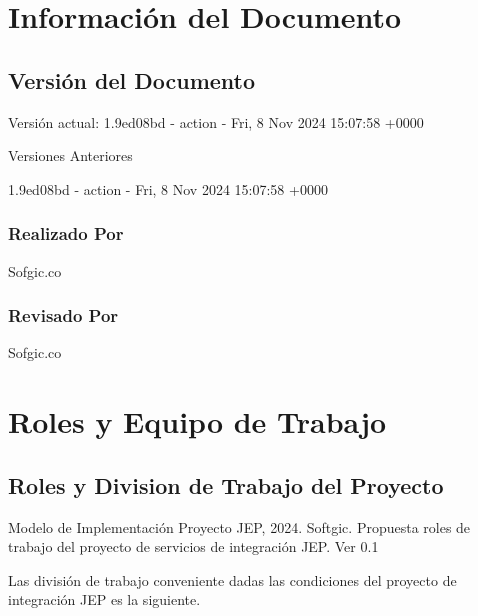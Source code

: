 \documentclass[
  paper=a4,
  ,captions=tableheading
]{scrartcl}
\renewenvironment{quote}{\begin{customblockquote}\list{}{\rightmargin=0em\leftmargin=0em}%
\item\relax\color{blockquote-text}\ignorespaces}{\unskip\unskip\endlist\end{customblockquote}}
\begin{document}
\newpage

\section{Información del
Documento}\label{sec:informaciuxf3n-del-documento}

\subsection{Versión del Documento}\label{sec:versiuxf3n-del-documento}

\begin{quote}
\end{quote}

Versión actual: 1.9ed08bd - action - Fri, 8 Nov 2024 15:07:58 +0000

Versiones Anteriores

1.9ed08bd - action - Fri, 8 Nov 2024 15:07:58 +0000

\subsubsection{Realizado Por}\label{sec:realizado-por}

Sofgic.co

\subsubsection{Revisado Por}\label{sec:revisado-por}

Sofgic.co

\newpage

\section{Roles y Equipo de Trabajo}\label{sec:roles-y-equipo-de-trabajo}

\subsection{Roles y Division de Trabajo del
Proyecto}\label{sec:roles-y-division-de-trabajo-del-proyecto}

\begin{quote}
Modelo de Implementación Proyecto JEP, 2024. Softgic. Propuesta roles de
trabajo del proyecto de servicios de integración JEP. Ver 0.1
\end{quote}

Las división de trabajo conveniente dadas las condiciones del proyecto
de integración JEP es la siguiente.
\end{document}
